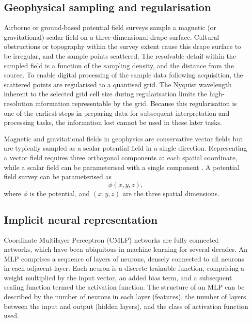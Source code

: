 \subsection{Geophysical sampling and regularisation}
\label{sec:geo_airborne}
Airborne or ground-based potential field surveys sample a magnetic (or gravitational) scalar field on a three-dimensional drape surface.
Cultural obstructions or topography within the survey extent cause this drape surface to be irregular, and the sample points scattered.
The resolvable detail within the sampled field is a function of the sampling density, and the distance from the source.
To enable digital processing of the sample data following acquisition, the scattered points are regularised to a quantised grid.
The Nyquist wavelength inherent to the selected grid cell size during regularisation limits the high-resolution information representable by the grid.
Because this regularisation is one of the earliest steps in preparing data for subsequent interpretation and processing tasks, the information lost cannot be used in these later tasks.

Magnetic and gravitational fields in geophysics are conservative vector fields but are typically sampled as a scalar potential field in a single direction.
Representing a vector field requires three orthogonal components at each spatial coordinate, while a scalar field can be parameterised with a single component \parencite{blakelyPotentialTheoryGravity1996}.
A potential field survey can be parameterised as
\begin{equation}
    \label{eqn:potential}
    \phi\left(x,y,z\right),
\end{equation}
where \(\phi{}\) is the potential, and \({(x,y,z)}\) are the three spatial dimensions.

\subsection{Implicit neural representation}
\label{sec:inr}
Coordinate Multilayer Perceptron (CMLP) networks are fully connected networks, which have been ubiquitous in machine learning for several decades.
An MLP comprises a sequence of layers of neurons, densely connected to all neurons in each adjacent layer.
Each neuron is a discrete trainable function, comprising a weight multiplied by the input vector, an added bias term, and a subsequent scaling function termed the activation function.
The structure of an MLP can be described by the number of neurons in each layer (features), the number of layers between the input and output (hidden layers), and the class of activation function used.

